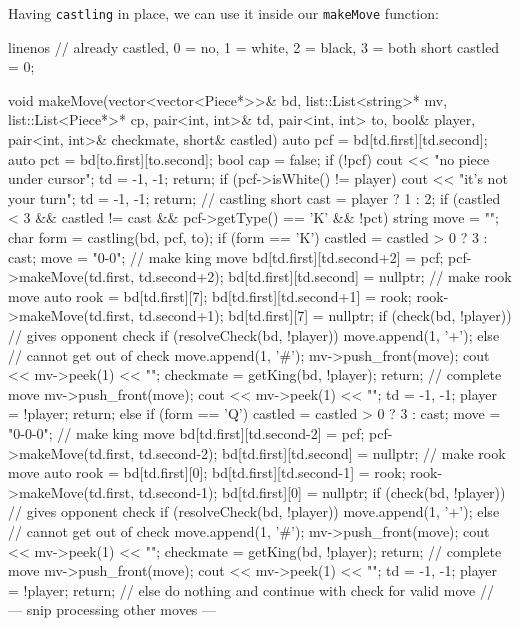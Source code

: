 Having \texttt{castling} in place, we can use it inside our \texttt{makeMove} function:

\begin{cpp*}{linenos}
// already castled, 0 = no, 1 = white, 2 = black, 3 = both
short castled = 0;

void makeMove(vector<vector<Piece*>>& bd,
              list::List<string>* mv,
              list::List<Piece*>* cp,
              pair<int, int>& td,
              pair<int, int> to,
              bool& player,
              pair<int, int>& checkmate,
              short& castled)
{
  auto pcf = bd[td.first][td.second];
  auto pct = bd[to.first][to.second];
  bool cap = false;
  if (!pcf) {
    cout << "no piece under cursor\n";
    td = {-1, -1};
    return;
  }
  if (pcf->isWhite() != player) {
    cout << "it's not your turn\n";
    td = {-1, -1};
    return;
  }
  // castling
  short cast = player ? 1 : 2;
  if (castled < 3 && castled != cast && pcf->getType() == 'K' && !pct) {
    string move = "";
    char form = castling(bd, pcf, to);
    if (form == 'K') {
      castled = castled > 0 ? 3 : cast;
      move = "0-0";
      // make king move
      bd[td.first][td.second+2] = pcf;
      pcf->makeMove(td.first, td.second+2);
      bd[td.first][td.second] = nullptr;
      // make rook move
      auto rook = bd[td.first][7];
      bd[td.first][td.second+1] = rook;
      rook->makeMove(td.first, td.second+1);
      bd[td.first][7] = nullptr;
      if (check(bd, !player)) { // gives opponent check
        if (resolveCheck(bd, !player)) {
          move.append(1, '+');
        } else { // cannot get out of check
          move.append(1, '#');
          mv->push_front(move);
          cout << mv->peek(1) << "\n";
          checkmate = getKing(bd, !player);
          return;
        }
      }
      // complete move
      mv->push_front(move);
      cout << mv->peek(1) << "\n";
      td = {-1, -1};
      player = !player;
      return;
    } else if (form == 'Q') {
      castled = castled > 0 ? 3 : cast;
      move = "0-0-0";
      // make king move
      bd[td.first][td.second-2] = pcf;
      pcf->makeMove(td.first, td.second-2);
      bd[td.first][td.second] = nullptr;
      // make rook move
      auto rook = bd[td.first][0];
      bd[td.first][td.second-1] = rook;
      rook->makeMove(td.first, td.second-1);
      bd[td.first][0] = nullptr;
      if (check(bd, !player)) { // gives opponent check
        if (resolveCheck(bd, !player)) {
          move.append(1, '+');
        } else { // cannot get out of check
          move.append(1, '#');
          mv->push_front(move);
          cout << mv->peek(1) << "\n";
          checkmate = getKing(bd, !player);
          return;
        }
      }
      // complete move
      mv->push_front(move);
      cout << mv->peek(1) << "\n";
      td = {-1, -1};
      player = !player;
      return;
    } // else do nothing and continue with check for valid move
  }
  // --- snip processing other moves ---
}
\end{cpp*}

